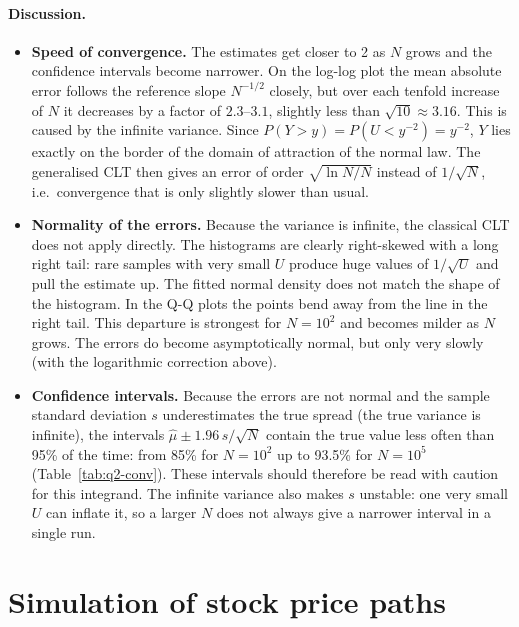 \documentclass[11pt,a4paper]{article}
\begin{document}
\paragraph{Discussion.}
\begin{itemize}
  \item \textbf{Speed of convergence.} The estimates get closer to 2 as $N$ grows and the
  confidence intervals become narrower. On the log-log plot the mean absolute error follows the
  reference slope $N^{-1/2}$ closely, but over each tenfold increase of $N$ it decreases by a
  factor of $2.3$--$3.1$, slightly less than $\sqrt{10} \approx 3.16$. This is caused by the
  infinite variance. Since $P(Y > y) = P(U < y^{-2}) = y^{-2}$, $Y$ lies exactly on the border
  of the domain of attraction of the normal law. The generalised CLT then gives an error of order
  $\sqrt{\ln N / N}$ instead of $1/\sqrt N$, i.e.\ convergence that is only slightly slower than
  usual.

  \item \textbf{Normality of the errors.} Because the variance is infinite, the classical CLT
  does not apply directly. The histograms are clearly right-skewed with a long right tail: rare
  samples with very small $U$ produce huge values of $1/\sqrt U$ and pull the estimate up. The
  fitted normal density does not match the shape of the histogram. In the Q-Q plots the points
  bend away from the line in the right tail. This departure is strongest for $N = 10^2$ and
  becomes milder as $N$ grows. The errors do become asymptotically normal, but only very slowly
  (with the logarithmic correction above).

  \item \textbf{Confidence intervals.} Because the errors are not normal and the sample standard
  deviation $s$ underestimates the true spread (the true variance is infinite), the intervals
  $\hat\mu \pm 1.96\,s/\sqrt N$ contain the true value less often than 95\% of the time: from
  85\% for $N = 10^2$ up to 93.5\% for $N = 10^5$ (Table~\ref{tab:q2-conv}). These intervals
  should therefore be read with caution for this integrand. The infinite variance also makes $s$
  unstable: one very small $U$ can inflate it, so a larger $N$ does not always give a narrower
  interval in a single run.
\end{itemize}

\section{Simulation of stock price paths}
\end{document}
